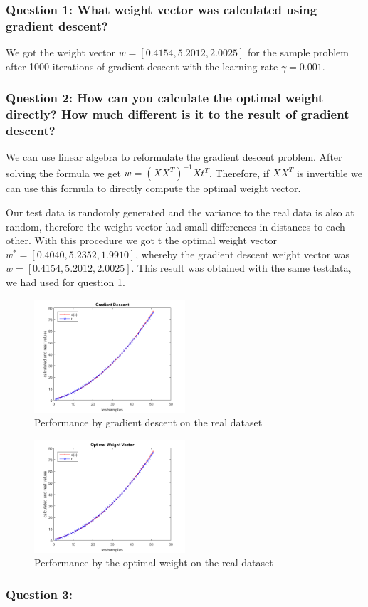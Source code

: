 \subsubsection{Question 1: What weight vector was calculated using gradient descent?}

We got the weight vector $w = [0.4154, 5.2012, 2.0025]$ for the sample problem after 1000 iterations of gradient descent with the learning rate $\gamma = 0.001$.

\subsubsection{Question 2: How can you calculate the optimal weight directly? How much different is it to the result of gradient descent?}

We can use linear algebra to reformulate the gradient descent problem. After solving the formula we get $w = (XX^T)^{-1}Xt^T$. Therefore, if $XX^T$ is invertible we can use this formula to directly compute the optimal weight vector.

Our test data is randomly generated and the variance to the real data is also at random, therefore the weight vector had small differences in distances to each other. With this procedure we got t the optimal weight vector $w^* = [0.4040, 5.2352, 1.9910]$, whereby the gradient descent weight vector was $w = [0.4154, 5.2012, 2.0025]$. This result was obtained with the same testdata, we had used for question 1. 

\begin{figure}[!ht]
	\centering
	\includegraphics[width=0.5\textwidth]{img/gradientDescent}
	\caption{Performance by gradient descent on the real dataset}
	\label{fig:perGraDescent}
\end{figure}


\begin{figure}[!ht]
	\centering
	\includegraphics[width=0.5\textwidth]{img/optimalWeightVector}
	\caption{Performance by the optimal weight on the real dataset}
	\label{fig:perOptimal}
\end{figure}



\subsubsection{Question 3: }





